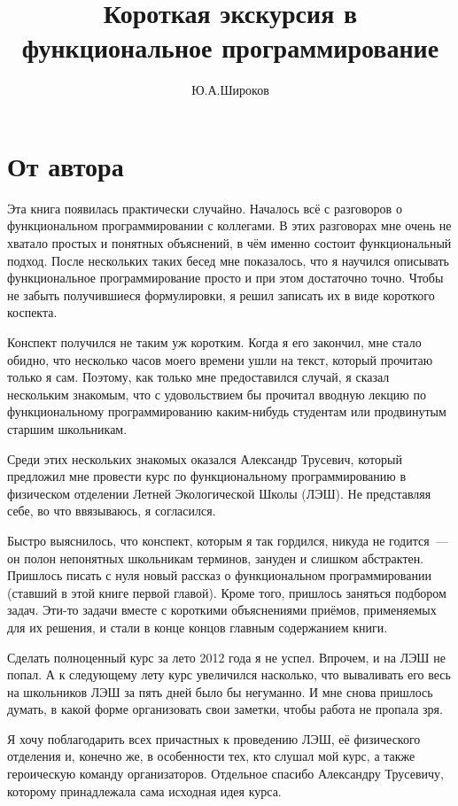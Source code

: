 \documentclass[
  paper=a4,
  fontsize=14pt,
  openany,
  appendixprefix=true
]{scrbook}
\author{Ю.А.Широков}
\title{Короткая экскурсия в функциональное программирование}
\begin{document}
\maketitle

\tableofcontents

\chapter*{От автора}

Эта книга появилась практически случайно. Началось всё с разговоров о функциональном программировании с коллегами. В этих разговорах мне очень не хватало простых и понятных объяснений, в чём именно состоит функциональный подход. После нескольких таких бесед мне показалось, что я научился описывать функциональное программирование просто и при этом достаточно точно. Чтобы не забыть получившиеся формулировки, я решил записать их в виде короткого коспекта.

Конспект получился не таким уж коротким. Когда я его закончил, мне стало обидно, что несколько часов моего времени ушли на текст, который прочитаю только я сам. Поэтому, как только мне предоставился случай, я сказал нескольким знакомым, что с удовольствием бы прочитал вводную лекцию по функциональному программированию каким-нибудь студентам или продвинутым старшим школьникам.

Среди этих нескольких знакомых оказался Александр Трусевич, который предложил мне провести курс по функциональному программированию в физическом отделении Летней Экологической Школы (ЛЭШ). Не представляя себе, во что ввязываюсь, я согласился.

Быстро выяснилось, что конспект, которым я так гордился, никуда не годится~--- он полон непонятных школьникам терминов, зануден и слишком абстрактен. Пришлось писать с нуля новый рассказ о функциональном программировании (ставший в этой книге первой главой). Кроме того, пришлось заняться подбором задач. Эти-то задачи вместе с короткими объяснениями приёмов, применяемых для их решения, и стали в конце концов главным содержанием книги.

Сделать полноценный курс за лето 2012 года я не успел. Впрочем, и на ЛЭШ не попал. А к следующему лету курс увеличился насколько, что вываливать его весь на школьников ЛЭШ за пять дней было бы негуманно. И мне снова пришлось думать, в какой форме организовать свои заметки, чтобы работа не пропала зря.

Я хочу поблагодарить всех причастных к проведению ЛЭШ, её физического отделения и, конечно же, в особенности тех, кто слушал мой курс, а также героическую команду организаторов. Отдельное спасибо Александру Трусевичу, которому принадлежала сама исходная идея курса.
\end{document}
